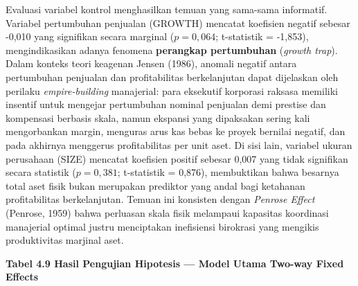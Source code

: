 \documentclass[12pt,a4paper]{article}
\begin{document}
Evaluasi variabel kontrol menghasilkan temuan yang sama-sama informatif.
Variabel pertumbuhan penjualan (GROWTH) mencatat koefisien negatif
sebesar -0,010 yang signifikan secara marginal (\(p = 0{,}064\);
t-statistik = -1,853), mengindikasikan adanya fenomena \textbf{perangkap
pertumbuhan} (\emph{growth trap}). Dalam konteks teori keagenan Jensen
(1986), anomali negatif antara pertumbuhan penjualan dan profitabilitas
berkelanjutan dapat dijelaskan oleh perilaku \emph{empire-building}
manajerial: para eksekutif korporasi raksasa memiliki insentif untuk
mengejar pertumbuhan nominal penjualan demi prestise dan kompensasi
berbasis skala, namun ekspansi yang dipaksakan sering kali mengorbankan
margin, menguras arus kas bebas ke proyek bernilai negatif, dan pada
akhirnya menggerus profitabilitas per unit aset. Di sisi lain, variabel
ukuran perusahaan (SIZE) mencatat koefisien positif sebesar 0,007 yang
tidak signifikan secara statistik (\(p = 0{,}381\); t-statistik =
0,876), membuktikan bahwa besarnya total aset fisik bukan merupakan
prediktor yang andal bagi ketahanan profitabilitas berkelanjutan. Temuan
ini konsisten dengan \emph{Penrose Effect} (Penrose, 1959) bahwa
perluasan skala fisik melampaui kapasitas koordinasi manajerial optimal
justru menciptakan inefisiensi birokrasi yang mengikis produktivitas
marjinal aset.

{}
\noindent\textbf{Tabel 4.9 Hasil Pengujian Hipotesis --- Model Utama Two-way Fixed Effects}
\end{document}
